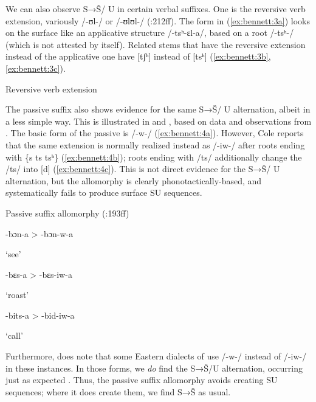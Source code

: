 \documentclass[output=paper,newtxmath,modfonts,nonflat]{langsci/langscibook}
\begin{document}
We can also observe S→Š/ {\longrule} U in certain verbal suffixes. One is the reversive verb extension, variously /-ʊl-/ or /-ʊlʊl-/  (\citealt{Cole1955}:212ff). The form in (\ref{ex:bennett:3a}) looks on the surface like an applicative structure /-tsʰ-ɛl-a/, based on a root /-tsʰ-/ (which is not attested by itself). Related stems that have the reversive extension instead of the applicative one have [tʃʰ] instead of [tsʰ] (\ref{ex:bennett:3b},\ref{ex:bennett:3c}).

\ea\label{ex:bennett:3}
Reversive verb extension
\ea\label{ex:bennett:3a}

\ex\label{ex:bennett:3b}

\ex\label{ex:bennett:3c}

\z
\z

The passive suffix also shows evidence for the same S→Š/ {\longrule} U alternation, albeit in a less simple way. This is illustrated in  and , based on data and observations from \citet[193--195]{Cole1955}. The basic form of the passive is /-w-/ (\ref{ex:bennett:4a}). However, Cole reports that the same extension is normally realized instead as /-iw-/ after roots ending with \{s ts tsʰ\} (\ref{ex:bennett:4b}); roots ending with /ts/ additionally change the /ts/ into [d] (\ref{ex:bennett:4c}). This is not direct evidence for the S→Š/ {\longrule} U alternation, but the allomorphy is clearly phonotactically-based, and systematically fails to produce surface SU sequences.

\ea\label{ex:bennett:4}
Passive suffix allomorphy (\citealt{Cole1955}:193ff)
\ea\label{ex:bennett:4a}

-bɔn-a  >  -bɔn-w-a

     ‘see’
\ex\label{ex:bennett:4b}

-bɛs-a  >  -bɛs-iw-a

     ‘roast’
\ex\label{ex:bennett:4c}

-bits-a  >  -bid-iw-a

     ‘call’\\
\z
\z

Furthermore, \citet{Cole1955} does note that some Eastern dialects of  use /-w-/ instead of /-iw-/ in these instances. In those forms, we \textit{do} find the S→Š/{\longrule}U alternation, occurring just as expected . Thus, the passive suffix allomorphy avoids creating SU sequences; where it does create them, we find S→Š as usual.
\end{document}
